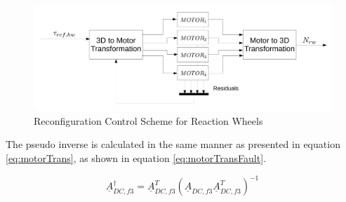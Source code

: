 \begin{figure}[h!]
	\centering 
	\includegraphics[width=170mm]{figures/reconfigure.pdf}	
	\caption{Reconfiguration Control Scheme for Reaction Wheels}
	\label{label{fig:reconfig}}
\end{figure}


The pseudo inverse is calculated in the same manner as presented in equation \ref{eq:motorTrans}, as shown in equation \ref{eq:motorTransFault}. 

\begin{equation}
\label{eq:motorTransFault}
\underline{A}_{DC,f3}^\dagger   = \underline{A}_{DC,f3}^T  (\underline{A}_{DC,f3} \underline{A}_{DC,f3}^T)^{-1}
\end{equation}